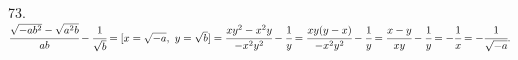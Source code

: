 73. $\cfrac{\sqrt{-ab^2}-\sqrt{a^2b}}{ab}-\cfrac{1}{\sqrt{b}}=[x=\sqrt{-a},\ y=\sqrt{b}]=
\cfrac{xy^2-x^2y}{-x^2y^2}-\cfrac{1}{y}=\cfrac{xy(y-x)}{-x^2y^2}-\cfrac{1}{y}=\cfrac{x-y}{xy}-\cfrac{1}{y}=-\cfrac{1}{x}=-\cfrac{1}{\sqrt{-a}}.$\\
